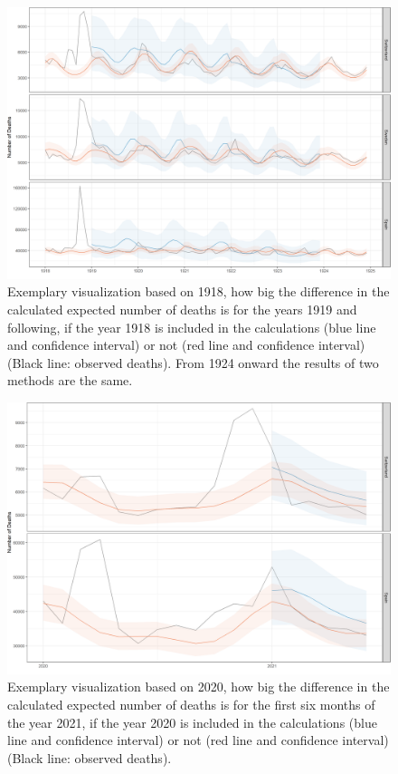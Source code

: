 \documentclass{article}
\begin{document}
	
	\begin{figure}[H]
		\centering	
		\includegraphics[width=\linewidth]{../Figure_S6a.png}
		\caption{Exemplary visualization based on 1918, how big the difference in the calculated expected number of deaths is for the years 1919 and following, if the year 1918 is included in the calculations (blue line and confidence interval) or not (red line and confidence interval) (Black line: observed deaths). From 1924 onward the results of two methods are the same. }
	\end{figure}
	
	\begin{figure}[H]
		\centering	
		\includegraphics[width=\linewidth]{../Figure_S6b.png}
		\caption{Exemplary visualization based on 2020, how big the difference in the calculated expected number of deaths is for the first six months of the year 2021, if the year 2020 is included in the calculations (blue line and confidence interval) or not (red line and confidence interval) (Black line: observed deaths). }
	\end{figure}
\end{document}
